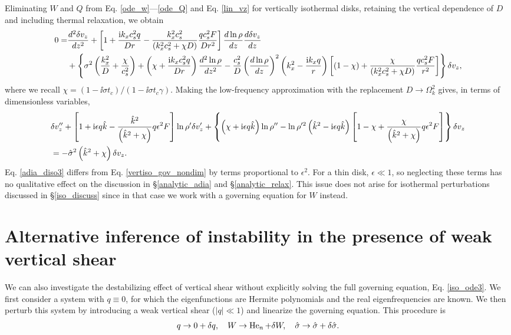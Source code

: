  Eliminating $W$ and $Q$ from Eq. \ref{ode_w}---\ref{ode_Q} and
 Eq. \ref{lin_vz} for vertically isothermal disks, retaining the
 vertical dependence of $D$ and including thermal relaxation, we
 obtain 
\begin{align}
  0 =& \frac{d^2\delta v_z}{dz^2} + \left[1 + \frac{\mathrm{i} k_x c_s^2
      q}{Dr} - \frac{k_x^2c_s^2}{\left(k_x^2c_s^2 + \chi
        D\right)}\frac{qc_s^2F}{Dr^2}\right]\frac{d\ln\rho}{dz}\frac{d\delta
    v_z}{dz} \notag\\
  &+ \left\{\sigma^2\left(\frac{k_x^2}{D} +
      \frac{\chi}{c_s^2}\right) + \left(\chi + \frac{\mathrm{i} k_x c_s^2
        q}{Dr}\right)\frac{d^2\ln\rho}{dz^2} -
    \frac{c_s^2}{D}\left(\frac{d\ln\rho}{dz}\right)^2\left(k_x^2 -
      \frac{\mathrm{i} k_x q}{r}\right)
   \left[\left(1-\chi\right) +
     \frac{\chi}{\left(k_x^2c_s^2 + \chi D\right)}\frac{qc_s^2 F}{r^2}\right] 
   \right\}\delta v_z,
\end{align}
where we recall $\chi = \left(1-\ii\sigma t_c\right)/\left(1-\ii\sigma
t_c \gamma\right)$. Making the low-frequency approximation with the
replacement $D\to \Omega_k^2$ gives, in terms of dimensionless
variables,
\begin{align}
   &\delta v_z ^{\prime\prime} + \left[1 + \mathrm{i}\epsilon q\hat{k} -
    \frac{ \hat{k}^2}{
      \left(\hat{k}^2+\chi\right)}q \epsilon^2F\right]\ln\rho^{\prime}\delta v_z^\prime +
  \left\{\left(\chi + \mathrm{i} \epsilon q
      \hat{k}\right)\ln\rho^{\prime\prime} - \ln\rho^{\prime
      2}\left(\hat{k}^2 -
      \mathrm{i}\epsilon
      q\hat{k}\right)\left[1 - \chi +
      \frac{\chi}{\left(\hat{k}^2+\chi\right)}q\epsilon^2F\right]\right\}\delta v_z \notag\\&=
  -\hat{\sigma}^2\left(\hat{k}^2+\chi\right)\delta v_z\label{adia_diso3}.
\end{align}   
Eq. \ref{adia_diso3} differs from Eq. \ref{vertiso_gov_nondim} by terms
proportional to $\epsilon^2$. For a thin disk, $\epsilon\ll1$, so
neglecting these terms has no qualitative effect on the discussion in
\S\ref{analytic_adia} and \S\ref{analytic_relax}.  This issue does not
arise for isothermal perturbations discussed in \S\ref{iso_discuss}
since in that case we work with a governing equation for $W$ instead. 

\section{Alternative inference of instability in the presence of weak
  vertical shear}\label{pert_theory}
We can also investigate the destabilizing effect of vertical shear
without explicitly solving the full governing equation,
Eq. \ref{iso_ode3}. We first
consider a system with $q\equiv0$, for which the eigenfunctions are
Hermite polynomials and the real eigenfrequencies are known. We then
perturb this system by introducing a weak vertical shear ($|q|\ll1$)
and linearize the governing equation. This procedure is
\begin{align}   
  q \to 0 + \delta q,\quad
  W \to \operatorname{He}_n + \delta W,\quad
  \hat{\sigma} \to \hat{\sigma} + \delta\hat{\sigma}. 
\end{align}

